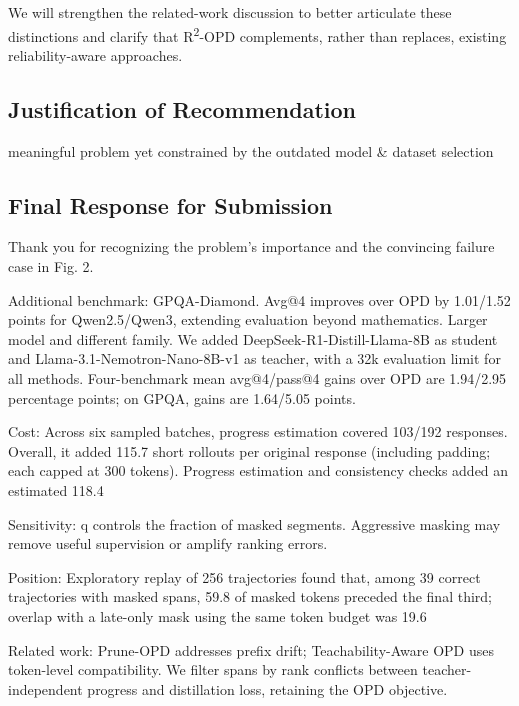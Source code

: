 \begin{enumerate}
\begin{responsebox}[frametitle={Response to W5}]
We will strengthen the related-work discussion to better articulate these distinctions and clarify that R\textsuperscript{2}-OPD complements, rather than replaces, existing reliability-aware approaches.
\end{responsebox}

\end{enumerate}

\subsection*{Justification of Recommendation}
meaningful problem yet constrained by the outdated model \& dataset selection

\subsection*{Final Response for Submission}
\par{}
\begin{responsebox}[frametitle={Final Response to Reviewer 2 (4R1c)},linecolor=finalgreen,backgroundcolor=finalfill]
Thank you for recognizing the problem's importance and the convincing failure case in Fig. 2.

Additional benchmark: GPQA-Diamond. Avg@4 improves over OPD by 1.01/1.52 points for Qwen2.5/Qwen3, extending evaluation beyond mathematics.
Larger model and different family. We added DeepSeek-R1-Distill-Llama-8B as student and Llama-3.1-Nemotron-Nano-8B-v1 as teacher, with a 32k evaluation limit for all methods. Four-benchmark mean avg@4/pass@4 gains over OPD are 1.94/2.95 percentage points; on GPQA, gains are 1.64/5.05 points.


Cost: Across six sampled batches, progress estimation covered 103/192 responses. Overall, it added 115.7 short rollouts per original response (including padding; each capped at 300 tokens). Progress estimation and consistency checks added an estimated 118.4%

Sensitivity: q controls the fraction of masked segments. Aggressive masking may remove useful supervision or amplify ranking errors.

Position: Exploratory replay of 256 trajectories found that, among 39 correct trajectories with masked spans, 59.8 of masked tokens preceded the final third; overlap with a late-only mask using the same token budget was 19.6%

Related work: Prune-OPD addresses prefix drift; Teachability-Aware OPD uses token-level compatibility. We filter spans by rank conflicts between teacher-independent progress and distillation loss, retaining the OPD objective.
\vspace*{4\baselineskip}
\end{responsebox}

